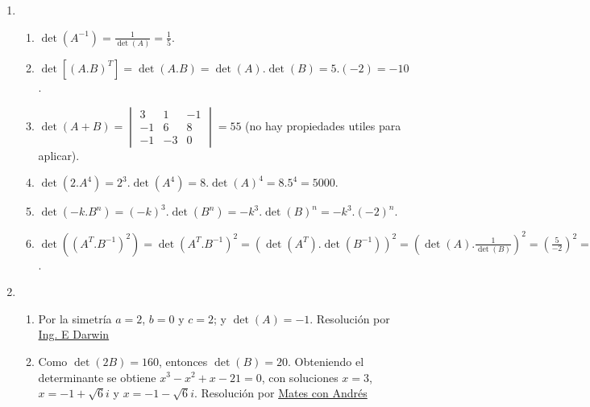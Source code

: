\documentclass[a4paper]{article}
\newcommand{\exercise}{\item}
\begin{document}
\begin{enumerate}
\begin{enumerate} [label=(\alph*)]
		\item $\det(M^{Rot}_{\alpha})=\begin{vmatrix} \cos(\alpha) & -\sin(\alpha) \\ \sin(\alpha) & \cos(\alpha) \end{vmatrix}=\cos^2(\alpha)+\sin^2(\alpha)=1$.
		\item $\det(M^{Ciz}_x)=\begin{vmatrix} 1 & k \\ 0 & 1 \end{vmatrix}=1$.  \\ $\det(M^{Ciz}_y)=\begin{vmatrix} 1 & 0 \\ k & 1 \end{vmatrix}=1$.
		\item $\det(M^{C/E}_x)=\begin{vmatrix} k & 1 \\ 0 & 1 \end{vmatrix}=k$.  \\ $\det(M^{C/E}_y)=\begin{vmatrix} 1 & 0 \\ 0 & k \end{vmatrix}=k$.
\end{enumerate}\exercise\begin{enumerate} [label=(\alph*)]		\item $\det(A^{-1})=\frac{1}{\det(A)}=\frac{1}{5}$.
		\item $\det[(A.B)^T]=\det(A.B)=\det(A).\det(B)=5.(-2)=-10$.
		\item $\det(A+B)=\begin{vmatrix} 3 & 1 & -1 \\ -1 & 6 & 8 \\ -1 & -3 & 0 \end{vmatrix}=55$ (no hay propiedades utiles para aplicar).  
		\item $\det(2.A^4)=2^3.\det(A^4)=8.\det(A)^4=8.5^4=5000$.
		\item $\det(-k.B^n)=(-k)^3.\det(B^n)=-k^3.\det(B)^n=-k^3.(-2)^n$.
		\item $\det\left((A^T.B^{-1})^2\right)=\det(A^T.B^{-1})^2=\left(\det(A^T).\det(B^{-1})\right)^2=\left(\det(A).\displaystyle{\frac{1}{\det(B)}}\right)^2=\left(\frac{5}{-2}\right)^2=\frac{25}{4}$.
\end{enumerate}\exercise\begin{enumerate} [label=(\alph*)]		\item Por la simetría $a=2$, $b=0$ y $c=2$; y $\det(A)=-1$. Resolución por \href{https://youtu.be/FhKTUHGGyhk}{Ing. E Darwin}
		\item Como $\det(2B)=160$, entonces $\det(B)=20$. Obteniendo el determinante se obtiene $x^3-x^2+x-21=0$, con soluciones $x=3$, $x=-1+\sqrt{6}i$ y $x=-1-\sqrt{6}i$. Resolución por \href{https://youtu.be/ysZg6eVeoSY}{Mates con Andrés}
\end{enumerate}\end{enumerate}
\end{document}
